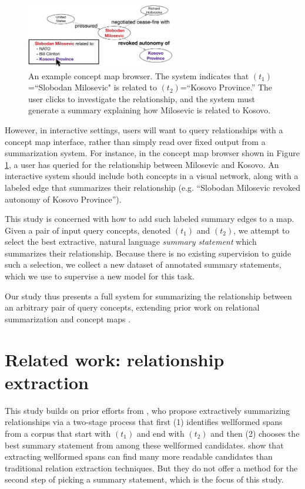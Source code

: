 \documentclass[11pt,a4paper]{article}
\begin{document}
\begin{figure}[htb!]
\centering
\includegraphics[width=6.5cm]{simple.pdf}
\caption{An example concept map browser. The system indicates that $(t_1)$=``Slobodan Milosevic" is related to $(t_2)$=``Kosovo Province.'' The user clicks to investigate the relationship, and the system must generate a summary explaining how Milosevic is related to Kosovo.}
\label{f:map}
\end{figure}

However, in interactive settings, users will want to query relationships with a concept map interface, rather than simply read over fixed output from a summarization system. For instance, in the concept map browser shown in Figure \ref{f:map}, a user has queried for the relationship between Milosevic and Kosovo. An interactive system should include both concepts in a visual network, along with a labeled edge that summarizes their relationship (e.g. ``Slobodan Milosevic revoked autonomy of Kosovo Province'').

This study is concerned with how to add such labeled summary edges to a map. Given a pair of input query concepts, denoted $(t_1)$ and $(t_2)$, we attempt to select the best extractive, natural language \textit{summary statement} which summarizes their relationship. Because there is no existing supervision to guide such a selection, we collect a new dataset of annotated summary statements, which we use to supervise a new model for this task. 

Our study thus presents a full system for summarizing the relationship between an arbitrary pair of query concepts, extending prior work on relational summarization and concept maps \cite{emnlp2017conceptmaps,N18-1159}.

\section{Related work: relationship extraction}

This study builds on prior efforts from \citet{N18-1159}, who propose extractively summarizing relationships via a two-stage process that first (1) identifies wellformed spans from a corpus that start with $(t_1)$ and end with $(t_2)$ and then (2) chooses the best summary statement from among these wellformed candidates. \citet{N18-1159} show that extracting wellformed spans can find many more readable candidates than traditional relation extraction techniques. But they do not offer a method for the second step of picking a summary statement, which is the focus of this study.
\end{document}
